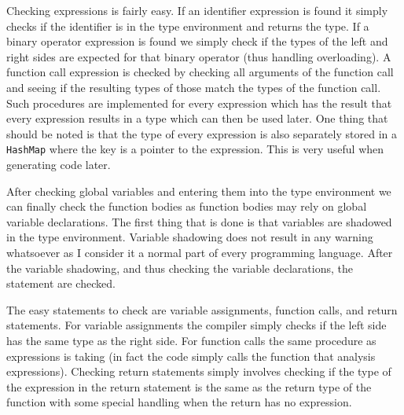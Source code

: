 \documentclass{article}
\begin{document}
Checking expressions is fairly easy. If an identifier expression is found it simply checks if the identifier is in the type environment and returns the type. If a binary operator expression is found we simply check if the types of the left and right sides are expected for that binary operator (thus handling overloading). A function call expression is checked by checking all arguments of the function call and seeing if the resulting types of those match the types of the function call. Such procedures are implemented for every expression which has the result that every expression results in a type which can then be used later. One thing that should be noted is that the type of every expression is also separately stored in a \texttt{HashMap} where the key is a pointer to the expression. This is very useful when generating code later.

After checking global variables and entering them into the type environment we can finally check the function bodies as function bodies may rely on global variable declarations. The first thing that is done is that variables are shadowed in the type environment. Variable shadowing does not result in any warning whatsoever as I consider it a normal part of every programming language. After the variable shadowing, and thus checking the variable declarations, the statement are checked.

The easy statements to check are variable assignments, function calls, and return statements. For variable assignments the compiler simply checks if the left side has the same type as the right side. For function calls the same procedure as expressions is taking (in fact the code simply calls the function that analysis expressions). Checking return statements simply involves checking if the type of the expression in the return statement is the same as the return type of the function with some special handling when the return has no expression.
\end{document}
